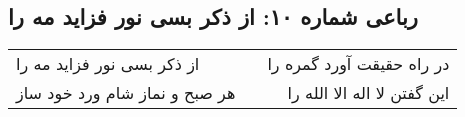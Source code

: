\begin{center}
\section*{رباعی شماره ۱۰: از ذکر بسی نور فزاید مه را}
\label{sec:0010}
\begin{longtable}{l p{0.5cm} r}
از ذکر بسی نور فزاید مه را
&&
در راه حقیقت آورد گمره را
\\
هر صبح و نماز شام ورد خود ساز
&&
این گفتن لا اله الا الله را
\\
\end{longtable}
\end{center}
